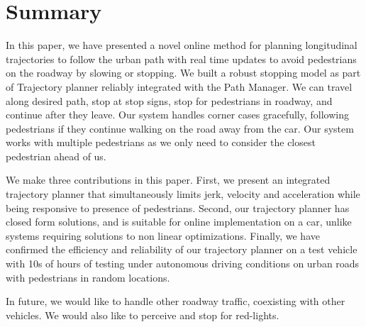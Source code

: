 \documentclass[letterpaper, 10 pt, conference]{ieeeconf}  %
\begin{document}



\section{Summary} \label{sec:summary}

In this paper, we have presented a novel online method for planning longitudinal trajectories 
to follow the urban path with real time updates to avoid pedestrians on the roadway by slowing or 
stopping. We built a robust stopping model as part of Trajectory planner reliably integrated with 
the Path Manager.
We can travel along desired path, stop at stop signs, stop for pedestrians in roadway, and continue after 
they leave. Our system handles corner cases gracefully, following pedestrians if they continue walking 
on the road away from the car. Our system works with multiple pedestrians as we only 
need to consider the closest pedestrian ahead of us. 

We make three contributions in this paper. First, we present an integrated trajectory planner that
simultaneously limits jerk, velocity and acceleration while being responsive to presence of pedestrians.
Second, our trajectory planner has closed form solutions, and is suitable for online implementation
on a car, unlike systems requiring solutions to non linear optimizations. Finally, we have confirmed the
efficiency and reliability of our trajectory planner on a test vehicle with 10s of hours of testing
under autonomous driving conditions on urban roads with pedestrians in random locations. 

In future, we would like to handle other roadway traffic, 
coexisting with other vehicles. We would also like to perceive and stop for red-lights.





\end{document}
